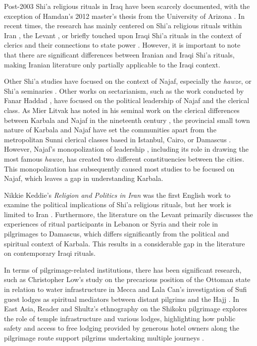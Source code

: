 Post-2003 Shi'a religious rituals in Iraq have been scarcely documented, with the exception of Hamdan's 2012 master's thesis from the University of Arizona \cite{hamdan_development_2012}. In recent times, the research has mainly centered on Shi'a religious rituals within Iran \cite{dabashi_taziyeh_2005} \cite{aghaie_martyrs_2004} \cite{flaskerud_visualizing_2012} \cite{saramifar_circling_2020}, the Levant \cite{weiss_shadow_2010} \cite{szanto_beyond_2013}, or briefly touched upon Iraqi Shi'a rituals in the context of clerics and their connections to state power \cite{nakash_reaching_2006} \cite{davis_memories_2005} \cite{cole_ayatollahs_2006}. However, it is important to note that there are significant differences between Iranian and Iraqi Shi'a rituals, making Iranian literature only partially applicable to the Iraqi context.

Other Shi'a studies have focused on the context of Najaf, especially the \emph{hawze}, or Shi'a seminaries \cite{kassem_modernization_2018} \cite{mottahedeh_najaf_2016}. Other works on sectarianism, such as the work conducted by Fanar Haddad \cite{haddad_understanding_2020}, have focused on the political leadership of Najaf and the clerical class. As Mier Litvak has noted in his seminal work on the clerical differences between Karbala and Najaf in the nineteenth century \cite{litvak_shii_2002}, the provincial small town nature of Karbala and Najaf have set the communities apart from the metropolitan Sunni clerical classes based in Istanbul, Cairo, or Damascus \cite[3]{litvak_shii_2002}. However, Najaf's monopolization of leadership \cite[64]{litvak_shii_2002}, including its role in drawing the most famous \emph{hawze}, has created two different constituencies between the cities. This monopolization has subsequently caused most studies to be focused on Najaf, which leaves a gap in understanding Karbala.

Nikkie Keddie's \emph{Religion and Politics in Iran} was the first English work to examine the political implications of Shi'a religious rituals, but her work is limited to Iran \cite{keddie_religion_1983}. Furthermore, the literature on the Levant primarily discusses the experiences of ritual participants in Lebanon or Syria and their role in pilgrimages to Damascus, which differs significantly from the political and spiritual context of Karbala. This results in a considerable gap in the literature on contemporary Iraqi rituals.

In terms of pilgrimage-related institutions, there has been significant research, such as Christopher Low's study on the precarious position of the Ottoman state in relation to water infrastructure in Mecca \cite{low_imperial_2020} and Lala Can's investigation of Sufi guest lodges as spiritual mediators between distant pilgrims and the Hajj \cite{can_spiritual_2020}. In East Asia, Reader and Shultz's ethnography on the Shikoku pilgrimage explores the role of temple infrastructure and various lodges, highlighting how public safety and access to free lodging provided by generous hotel owners along the pilgrimage route support pilgrims undertaking multiple journeys \cite{reader_pilgrims_2021}.

